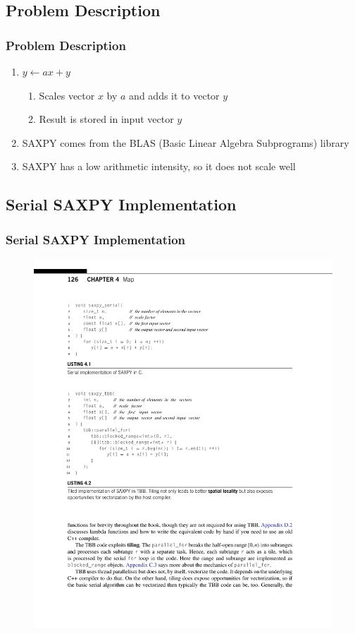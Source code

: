 \documentclass[xcolor=dvipsnames]{beamer}
\begin{document}
	\subsection{Problem Description}
	
		\begin{frame} \frametitle{Problem Description}
		\begin{enumerate}
		
		\item $y \leftarrow ax + y$
		
		\begin{enumerate}
			\item Scales vector $x$ by $a$ and adds it to vector $y$ 
			\item Result is stored in input vector $y$
		\end{enumerate}
		
		\item SAXPY comes from the BLAS (Basic Linear Algebra Subprograms) library
		\item SAXPY has a low arithmetic intensity, so it does not scale well
		
		\end{enumerate}
		\end{frame}
	
	\subsection{Serial SAXPY Implementation}
	
		\begin{frame} \frametitle{Serial SAXPY Implementation}
			\begin{figure}
				\centering
				\includegraphics[width=115mm]{images/listing-4-1.pdf}
			\end{figure}
		\end{frame}
		
\end{document}
